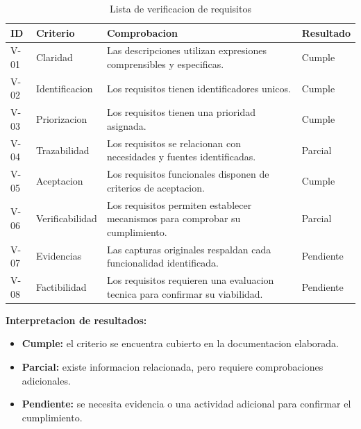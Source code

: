 \documentclass[11pt,a4paper]{article}
\begin{document}
\begin{table}[H]
\centering
\caption{Lista de verificacion de requisitos}
\small
\begin{tabularx}{\textwidth}{p{1.5cm}YYp{2cm}}
\toprule
\textbf{ID} &
\textbf{Criterio} &
\textbf{Comprobacion} &
\textbf{Resultado} \\
\midrule

V-01 &
Claridad &
Las descripciones utilizan expresiones
comprensibles y especificas. &
Cumple \\

V-02 &
Identificacion &
Los requisitos tienen identificadores unicos. &
Cumple \\

V-03 &
Priorizacion &
Los requisitos tienen una prioridad asignada. &
Cumple \\

V-04 &
Trazabilidad &
Los requisitos se relacionan con necesidades
y fuentes identificadas. &
Parcial \\

V-05 &
Aceptacion &
Los requisitos funcionales disponen de
criterios de aceptacion. &
Cumple \\

V-06 &
Verificabilidad &
Los requisitos permiten establecer mecanismos
para comprobar su cumplimiento. &
Parcial \\

V-07 &
Evidencias &
Las capturas originales respaldan cada
funcionalidad identificada. &
Pendiente \\

V-08 &
Factibilidad &
Los requisitos requieren una evaluacion
tecnica para confirmar su viabilidad. &
Pendiente \\

\bottomrule
\end{tabularx}
\end{table}

\textbf{Interpretacion de resultados:}

\begin{itemize}
    \item \textbf{Cumple:} el criterio se encuentra
    cubierto en la documentacion elaborada.

    \item \textbf{Parcial:} existe informacion
    relacionada, pero requiere comprobaciones
    adicionales.

    \item \textbf{Pendiente:} se necesita evidencia
    o una actividad adicional para confirmar
    el cumplimiento.
\end{itemize}
\end{document}
